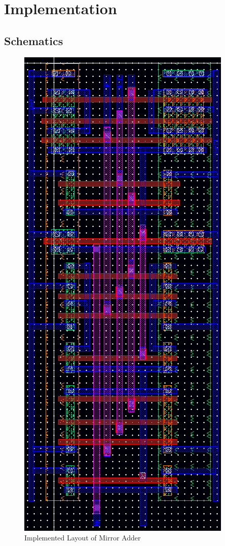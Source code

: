 \documentclass[12pt]{article}
\begin{document}
\section{Implementation}
\subsection{Schematics}
\begin{figure}[H]
\centering
\caption{Implemented Layout of Mirror Adder}
\includegraphics[width=\textwidth,height=\textheight,keepaspectratio]{layout}

\label{fig:layout}
\end{figure}
\end{document}
